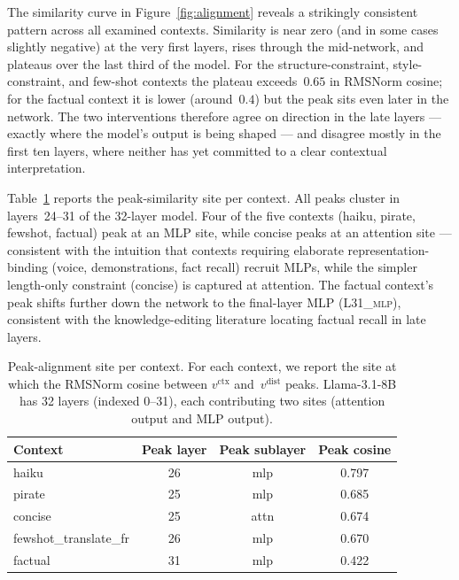 \documentclass{article}
\begin{document}
The similarity curve in Figure~\ref{fig:alignment} reveals a strikingly
consistent pattern across all examined contexts. Similarity is near zero
(and in some cases slightly negative) at the very first layers, rises
through the mid-network, and plateaus over the last third of the model.
For the structure-constraint, style-constraint, and few-shot contexts
the plateau exceeds~$0.65$ in RMSNorm cosine; for the factual context it
is lower (around~$0.4$) but the peak sits even later in the network. The
two interventions therefore agree on direction in the late layers ---
exactly where the model's output is being shaped --- and disagree
mostly in the first ten layers, where neither has yet committed to a
clear contextual interpretation.

Table~\ref{tab:peak} reports the peak-similarity site per context. All
peaks cluster in layers~24--31 of the 32-layer model. Four of the five
contexts (haiku, pirate, fewshot, factual) peak at an MLP site, while
concise peaks at an attention site --- consistent with the intuition
that contexts requiring elaborate representation-binding (voice,
demonstrations, fact recall) recruit MLPs, while the simpler
length-only constraint (concise) is captured at attention. The factual
context's peak shifts further down the network to the final-layer MLP
(\textsc{L31\_mlp}), consistent with the knowledge-editing literature
locating factual recall in late layers.

\begin{table}[t]
\centering
\caption{Peak-alignment site per context. For each context, we report the
site at which the RMSNorm cosine between $v^\text{ctx}$ and~$v^\text{dist}$
peaks. Llama-3.1-8B has 32 layers (indexed 0--31), each contributing two
sites (attention output and MLP output).}
\label{tab:peak}
\begin{tabular}{lccc}
\toprule
Context & Peak layer & Peak sublayer & Peak cosine \\
\midrule
haiku                  & 26   & mlp  & 0.797 \\
pirate                 & 25   & mlp  & 0.685 \\
concise                & 25   & attn & 0.674 \\
fewshot\_translate\_fr & 26   & mlp  & 0.670 \\
factual                & 31   & mlp  & 0.422 \\
\bottomrule
\end{tabular}
\end{table}
\end{document}
